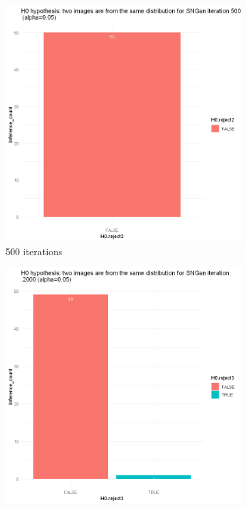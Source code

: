 \documentclass{article}
\begin{document}
\begin{figure}[h!]
    \caption{Dataset Face}
     \centering
     \begin{subfigure}[b]{0.3\textwidth}
         \centering
         \includegraphics[width=\textwidth]{kmmd_figures/sngan_face_500.png}
         \caption{500 iterations}
     \end{subfigure}
     \hfill
     \begin{subfigure}[b]{0.3\textwidth}
         \centering
         \includegraphics[width=\textwidth]{kmmd_figures/sngan_face_2000.png}

\end{subfigure}
\end{figure}
\end{document}
